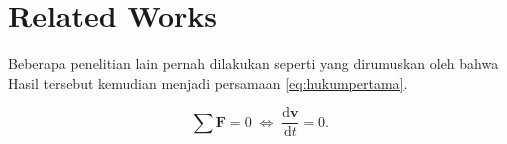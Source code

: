 \section{Related Works}
\label{sec:relatedworks}


Beberapa penelitian lain pernah dilakukan seperti yang dirumuskan oleh \citet{newton1687} bahwa \lipsum[5]
Hasil tersebut kemudian menjadi persamaan \ref{eq:hukumpertama}.

\begin{equation}
  \label{eq:hukumpertama}
  \sum \mathbf{F} = 0\; \Leftrightarrow\; \frac{\mathrm{d} \mathbf{v} }{\mathrm{d}t} = 0.
\end{equation}

\lipsum[6-7]
